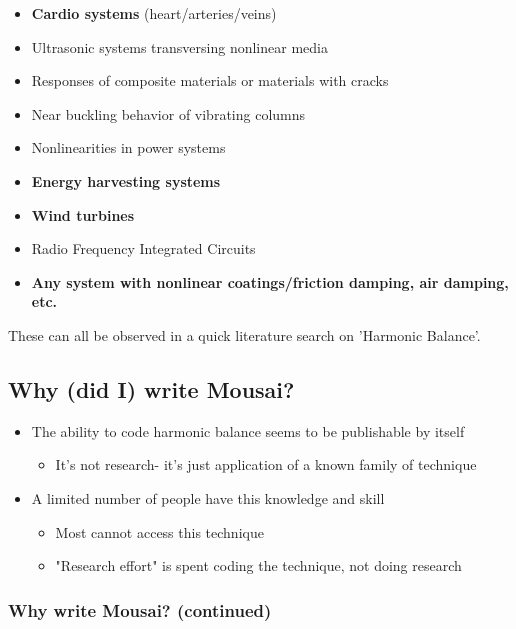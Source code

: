 \documentclass[11pt]{article}
\providecommand{\tightlist}{%
      \setlength{\itemsep}{0pt}\setlength{\parskip}{0pt}}
\begin{document}
    \begin{itemize}
\tightlist
\item
  \textbf{Cardio systems} (heart/arteries/veins)
\item
  Ultrasonic systems transversing nonlinear media
\item
  Responses of composite materials or materials with cracks
\item
  Near buckling behavior of vibrating columns
\item
  Nonlinearities in power systems
\item
  \textbf{Energy harvesting systems}
\item
  \textbf{Wind turbines}
\item
  Radio Frequency Integrated Circuits
\item
  \textbf{Any system with nonlinear coatings/friction damping, air
  damping, etc.}
\end{itemize}

These can all be observed in a quick literature search on 'Harmonic
Balance'.

    \subsection{Why (did I) write Mousai?}\label{why-did-i-write-mousai}

\begin{itemize}
\tightlist
\item
  The ability to code harmonic balance seems to be publishable by itself

  \begin{itemize}
  \tightlist
  \item
    It's not research- it's just application of a known family of
    technique
  \end{itemize}
\item
  A limited number of people have this knowledge and skill

  \begin{itemize}
  \tightlist
  \item
    Most cannot access this technique
  \item
    "Research effort" is spent coding the technique, not doing research
  \end{itemize}
\end{itemize}

    \subsubsection{Why write Mousai?
(continued)}\label{why-write-mousai-continued}
\end{document}
